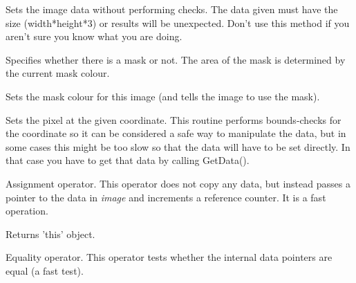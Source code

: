 
Sets the image data without performing checks. The data given must have
the size (width*height*3) or results will be unexpected. Don't use this
method if you aren't sure you know what you are doing.

\label{wximagesetmask}


Specifies whether there is a mask or not. The area of the mask is determined by the current mask colour.

\label{wximagesetmaskcolour}


Sets the mask colour for this image (and tells the image to use the mask).

\label{wximagesetrgb}


Sets the pixel at the given coordinate. This routine performs bounds-checks
for the coordinate so it can be considered a safe way to manipulate the
data, but in some cases this might be too slow so that the data will have to
be set directly. In that case you have to get that data by calling GetData().



Assignment operator. This operator does not copy any data, but instead
passes a pointer to the data in {\it image} and increments a reference
counter. It is a fast operation.




Returns 'this' object.



Equality operator. This operator tests whether the internal data pointers are
equal (a fast test).

